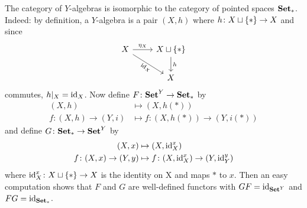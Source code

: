 \begin{example}
    The category of $Y$-algebras is isomorphic to the category of pointed spaces $\mathbf{Set_{\ast}}$.
    Indeed: by definition, a $Y$-algebra is a pair $(X,h)$ where $h \colon X \sqcup \{\ast\} \to X$
    and since 
    \[
     \begin{tikzcd}
         X \ar[r,"\eta_X"] \ar[rd,"\id_X"',sloped]
         & X \sqcup \pt \ar[d,"h"] \\
         & X 
     \end{tikzcd}
    \]
    commutes, $h\arrowvert_X = \operatorname{id}_X$. Now define $F \colon \mathbf{Set}^Y \to \mathbf{Set_{\ast}}$ by 
    \begin{align*}
        (X,h) &\mapsto (X,h(\ast)) \\
        f \colon (X,h) \to (Y,i) &\mapsto f \colon (X,h(\ast)) \to (Y,i(\ast))
    \end{align*}
    and define $G \colon \mathbf{Set_{\ast}} \to \mathbf{Set}^Y$ by 
    \begin{align*}
        (X,x) &\mapsto (X, \operatorname{id}_{X}^x) \\
        f \colon (X,x) \to (Y,y) &\mapsto f \colon (X,\operatorname{id}_{X}^x) \to (Y,\operatorname{id}_Y^y)
    \end{align*}
    where $\operatorname{id}_X^x \colon X \sqcup \{\ast\} \to X$ is the identity on X and maps $\ast$ to $x$.
    Then an easy computation shows that $F$ and $G$ are well-defined functors with
    $GF=\operatorname{id}_{\mathbf{Set}^Y}$ and $FG=\operatorname{id}_{\mathbf{Set_{\ast}}}$.
    \todo{}
\end{example}


